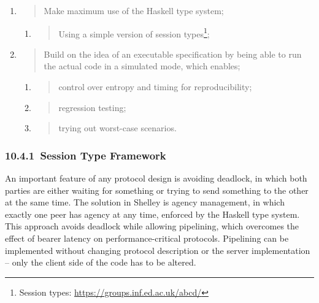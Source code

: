 \documentclass[11pt,a4paper]{article}
\begin{document}
\begin{enumerate}
\def\labelenumi{\arabic{enumi}.}
\item
  \begin{quote}
  Make maximum use of the Haskell type system;
  \end{quote}

  \begin{enumerate}
  \def\labelenumii{\alph{enumii}.}
  \item
    \begin{quote}
    Using a simple version of session types\footnote{Session types:
      \href{https://groups.inf.ed.ac.uk/abcd/}{{https://groups.inf.ed.ac.uk/abcd/}}};
    \end{quote}
  \end{enumerate}
\item
  \begin{quote}
  Build on the idea of an executable specification by being able to run
  the actual code in a simulated mode, which enables;
  \end{quote}

  \begin{enumerate}
  \def\labelenumii{\alph{enumii}.}
  \setcounter{enumii}{1}
  \item
    \begin{quote}
    control over entropy and timing for reproducibility;
    \end{quote}
  \item
    \begin{quote}
    regression testing;
    \end{quote}
  \item
    \begin{quote}
    trying out worst-case scenarios.
    \end{quote}
  \end{enumerate}
\end{enumerate}

\hypertarget{session-type-framework}{%
\subsubsection{​10.4.1​~Session Type
Framework}\label{session-type-framework}}

An important feature of any protocol design is avoiding deadlock, in
which both parties are either waiting for something or trying to send
something to the other at the same time. The solution in Shelley is
agency management, in which exactly one peer has agency at any time,
enforced by the Haskell type system. This approach avoids deadlock while
allowing pipelining, which overcomes the effect of bearer latency on
performance-critical protocols. Pipelining can be implemented without
changing protocol description or the server implementation -- only the
client side of the code has to be altered.
\end{document}
